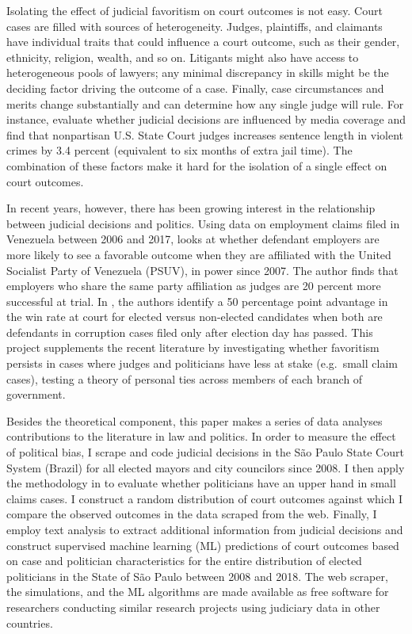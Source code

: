 \documentclass[11pt]{article}
\begin{document}
Isolating the effect of judicial favoritism on court outcomes is not easy. Court cases are filled with sources of heterogeneity. Judges, plaintiffs, and claimants have individual traits that could influence a court outcome, such as their gender, ethnicity, religion, wealth, and so on. Litigants might also have access to heterogeneous pools of lawyers; any minimal discrepancy in skills might be the deciding factor driving the outcome of a case. Finally, case circumstances and merits change substantially and can determine how any single judge will rule. For instance, \citet{LimJudgePoliticianPress2015} evaluate whether judicial decisions are influenced by media coverage and find that nonpartisan U.S. State Court judges increases sentence length in violent crimes by 3.4 percent (equivalent to six months of extra jail time). The combination of these factors make it hard for the isolation of a single effect on court outcomes.

In recent years, however, there has been growing interest in the relationship between judicial decisions and politics. Using data on employment claims filed in Venezuela between 2006 and 2017, \citet{Sanchez-MartinezDismantlingInstitutionsCourt2018} looks at whether defendant employers are more likely to see a favorable outcome when they are affiliated with the United Socialist Party of Venezuela (PSUV), in power since 2007. The author finds that employers who share the same party affiliation as judges are 20 percent more successful at trial. In \citet{LambaisJudicialSubversionEvidence2018}, the authors identify a 50 percentage point advantage in the win rate at court for elected versus non-elected candidates when both are defendants in corruption cases filed only after election day has passed. This project supplements the recent literature by investigating whether favoritism persists in cases where judges and politicians have less at stake (e.g.~small claim cases), testing a theory of personal ties across members of each branch of government.

Besides the theoretical component, this paper makes a series of data analyses contributions to the literature in law and politics. In order to measure the effect of political bias, I scrape and code judicial decisions in the São Paulo State Court System (Brazil) for all elected mayors and city councilors since 2008. I then apply the methodology in \citet{AbramsJudgesVaryTheir2012} to evaluate whether politicians have an upper hand in small claims cases. I construct a random distribution of court outcomes against which I compare the observed outcomes in the data scraped from the web. Finally, I employ text analysis to extract additional information from judicial decisions and construct supervised machine learning (ML) predictions of court outcomes based on case and politician characteristics for the entire distribution of elected politicians in the State of São Paulo between 2008 and 2018. The web scraper, the simulations, and the ML algorithms are made available as free software for researchers conducting similar research projects using judiciary data in other countries.
\end{document}

